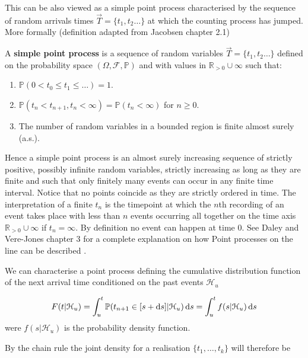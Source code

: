 This can be also viewed as a simple point process characterised by the sequence of random arrivals times $\vec{T} = \{ t_1, t_2 \dots \}$ at which the counting process has jumped. More formally (definition adapted from Jacobsen \cite{Jacobsen} chapter 2.1)

\begin{definition}
    A \textbf{simple point process} is a sequence of random variables $\vec{T} = \{ t_1, t_2 \dots \}$ defined on the probability space $(\Omega, \mathcal{F}, \mathbb{P})$ and with values in $\mathbb{R}_{>0} \cup \infty$ such that:
    \begin{enumerate}[label=(\roman*)]
        \item $\mathbb{P}(0 < t_0 \leq t_1 \leq \dots) = 1$.
        \item $\mathbb{P}(t_n < t_{n+1}, t_n < \infty) = \mathbb{P}(t_n < \infty)$ for $n \geq 0$.
        \item The number of random variables in a bounded region is finite almost surely (a.s.).
    \end{enumerate}
\end{definition}

Hence a simple point process is an almost surely increasing sequence of strictly positive, possibly infinite random variables, strictly increasing as long as they are finite and such that only finitely many events can occur in any finite time interval. Notice that no points coincide as they are strictly ordered in time.
The interpretation of a finite $t_n$ is the timepoint at which the $n$th recording of an event takes place with less than $n$ events occurring all together on the time axis $\mathbb{R}_{>0} \cup \infty$ if $t_n = \infty$. By definition no event can happen at time $0$. See Daley and Vere-Jones chapter 3 for a complete explanation on how Point processes on the line can be described \cite{Daley}.

We can characterise a point process defining the cumulative distribution function of the next arrival time conditioned on the past events $\mathcal{H}_u$

\begin{equation} \label{eq:CumDistPointProc}
    F(t|\mathcal{H}_u) = \int_u^t \mathbb{P}(t_{n+1} \in [s+\operatorname{d}\!{s}] | \mathcal{H}_u) \operatorname{d}\!{s} = \int_u^t f(s | \mathcal{H}_u) \operatorname{d}\!{s}
\end{equation}
were $f(s | \mathcal{H}_u)$ is the probability density function.

By the chain rule the joint density for a realisation $\{ t_1, \dots, t_k\}$ will therefore be


